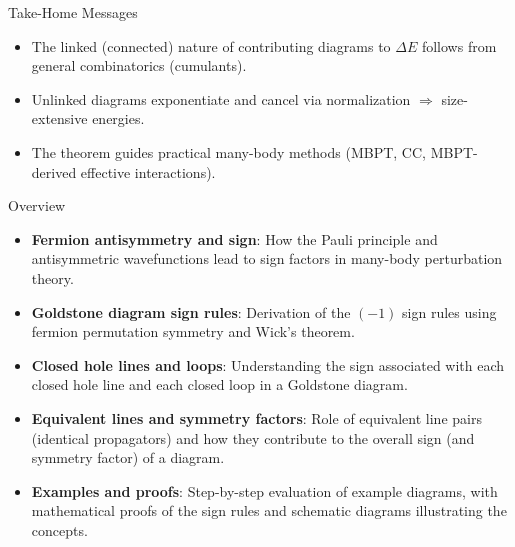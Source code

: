 \documentclass[aspectratio=169,11pt]{beamer}
\begin{document}
\begin{frame}{Take-Home Messages}
\begin{itemize}
  \item The linked (connected) nature of contributing diagrams to $\Delta E$ follows from general combinatorics (cumulants).
  \item Unlinked diagrams exponentiate and cancel via normalization $\Rightarrow$ size-extensive energies.
  \item The theorem guides practical many-body methods (MBPT, CC, MBPT-derived effective interactions).
\end{itemize}
\end{frame}

\begin{frame}{Overview}
  \begin{itemize}
    \item \textbf{Fermion antisymmetry and sign}: How the Pauli principle and antisymmetric wavefunctions lead to sign factors in many-body perturbation theory.
    \item \textbf{Goldstone diagram sign rules}: Derivation of the $(-1)$ sign rules using fermion permutation symmetry and Wick's theorem.
    \item \textbf{Closed hole lines and loops}: Understanding the sign associated with each closed hole line and each closed loop in a Goldstone diagram.
    \item \textbf{Equivalent lines and symmetry factors}: Role of equivalent line pairs (identical propagators) and how they contribute to the overall sign (and symmetry factor) of a diagram.
    \item \textbf{Examples and proofs}: Step-by-step evaluation of example diagrams, with mathematical proofs of the sign rules and schematic diagrams illustrating the concepts.
  \end{itemize}
\end{frame}
\end{document}

